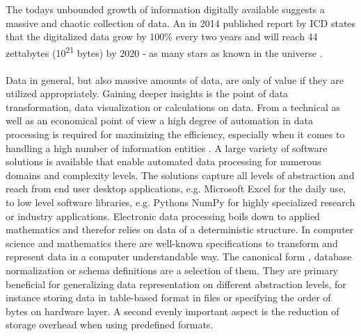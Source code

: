 The todays unbounded growth of information digitally available suggests a massive and chaotic collection of data. An in 2014 published report by ICD states that the digitalized data grow by 100\% every two years and will reach 44 zettabytes (10\textsuperscript{21} bytes) by 2020 - as many stars as known in the universe \cite{data_growth_2014}.
\\\\
Data in general, but also massive amounts of data, are only of value if they are utilized appropriately. Gaining deeper insights is the point of data transformation, data visualization or calculations on data. From a technical as well as an economical point of view a high degree of automation in data processing is required for maximizing the efficiency, especially when it comes to handling a high number of information entities \cite{labrinidis_jagadish_2012}. A large variety of software solutions is available that enable automated data processing for numerous domains and complexity levels. The solutions capture all levels of abstraction and reach from end user desktop applications, e.g. Microsoft Excel \cite{excel_2017} for the daily use, to low level software libraries, e.g. Pythons NumPy \cite{numpy_2017} for highly specialized research or industry applications. Electronic data processing boils down to applied mathematics and therefor relies on data of a deterministic structure. In computer science and mathematics there are well-known specifications to transform and represent data in a computer understandable way. The canonical form \cite[p. 91 ff.]{dorst_doran_lasenby_2012}, database normalization \cite[p. 743]{halpin_tony_morgan_2010} or schema definitions \cite[p. 62]{halpin_tony_morgan_2010} are a selection of them. They are primary beneficial for generalizing data representation on different abstraction levels, for instance storing data in table-based format in files or specifying the order of bytes on hardware layer. A second evenly important aspect is the reduction of storage overhead when using predefined formats.
\\\\
